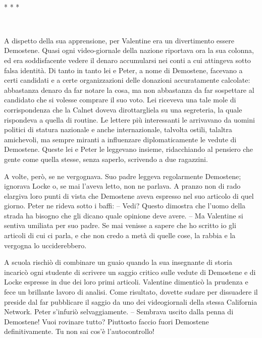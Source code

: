 {~}

\begin{center}
	{* * *}
\end{center}

{~}

{A dispetto della sua apprensione, per Valentine era un divertimento
	essere Demostene. Quasi ogni video-giornale della nazione riportava ora
	la sua colonna, ed era soddisfacente vedere il denaro accumularsi nei
	conti a cui attingeva sotto falsa identità. Di tanto in tanto lei e
	Peter, a nome di Demostene, facevano a certi candidati e a certe
	organizzazioni delle donazioni accuratamente calcolate: abbastanza
	denaro da far notare la cosa, ma non abbastanza da far sospettare al
	candidato che si volesse comprare il suo voto. Lei riceveva una tale
	mole di corrispondenza che la Calnet doveva dirottargliela su una
	segreteria, la quale rispondeva a quella di routine. Le lettere più
	interessanti le arrivavano da uomini politici di statura nazionale e
	anche internazionale, talvolta ostili, talaltra amichevoli, ma sempre
	miranti a influenzare diplomaticamente le vedute di Demostene. Queste
	lei e Peter le leggevano insieme, ridacchiando al pensiero che gente
	come quella stesse, senza saperlo, scrivendo a due ragazzini.}

{A volte, però, se ne vergognava. Suo padre leggeva regolarmente
	Demostene; ignorava Locke o, se mai l'aveva letto, non ne parlava. A
	pranzo non di rado elargiva loro punti di vista che Demostene aveva
	espresso nel suo articolo di quel giorno. Peter ne rideva sotto i baffi:
	-- Vedi? Questo dimostra che l'uomo della strada ha bisogno che gli
	dicano quale opinione deve avere. -- Ma Valentine si sentiva umiliata
	per suo padre. Se mai venisse a sapere che ho scritto io gli articoli di
	cui ci parla, e che non credo a metà di quelle cose, la rabbia e la
	vergogna lo ucciderebbero.}

{A scuola rischiò di combinare un guaio quando la sua insegnante di
	storia incaricò ogni studente di scrivere un saggio critico sulle vedute
	di Demostene e di Locke espresse in due dei loro primi articoli.
	Valentine dimenticò la prudenza e fece un brillante lavoro di analisi.
	Come risultato, dovette sudare per dissuadere il preside dal far
	pubblicare il saggio da uno dei videogiornali della stessa California
	Network. Peter s'infuriò selvaggiamente. -- Sembrava uscito dalla penna
	di Demostene! Vuoi rovinare tutto? Piuttosto faccio fuori Demostene
	definitivamente. Tu non sai cos'è l'autocontrollo!}

